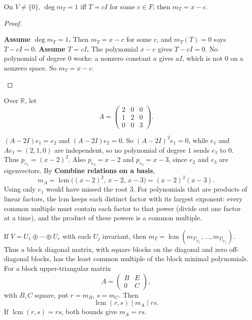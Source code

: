 \begin{proposition*}
On $V\ne\{0\}$, $\deg m_T=1$ iff $T=cI$ for some $c\in F$; then $m_T=x-c$.
\end{proposition*}
\begin{prob}\begin{proof}\begin{steps}
\ii \textbf{Assume $\deg m_T=1$.} Then $m_T=x-c$ for some $c$, and $m_T(T)=0$ says $T-cI=0$.
\ii \textbf{Assume $T=cI$.} The polynomial $x-c$ gives $T-cI=0$. No polynomial of degree $0$ works: a nonzero constant $a$ gives $aI$, which is not $0$ on a nonzero space. So $m_T=x-c$.
\end{steps}\end{proof}\end{prob}
\begin{example*}
Over $\mathbb R$, let
\[ A=\begin{pmatrix}2&0&0\\1&2&0\\0&0&3\end{pmatrix}. \]
\begin{steps}
\ii $(A-2I)e_1=e_2$ and $(A-2I)e_2=0$. So $(A-2I)^2e_1=0$, while $e_1$ and $Ae_1=(2,1,0)$ are independent, so no polynomial of degree $1$ sends $e_1$ to $0$. Thus $p_{e_1}=(x-2)^2$. Also $p_{e_2}=x-2$ and $p_{e_3}=x-3$, since $e_2$ and $e_3$ are eigenvectors.
\ii By \textbf{Combine relations on a basis},
\[ m_A=\operatorname{lcm}\bigl((x-2)^2,\,x-2,\,x-3\bigr)=(x-2)^2(x-3). \]
 Using only $e_1$ would have missed the root $3$. For polynomials that are products of linear factors, the lcm keeps each distinct factor with its largest exponent: every common multiple must contain each factor to that power (divide out one factor at a time), and the product of these powers is a common multiple.
\end{steps}\end{example*}
\begin{proposition*}
If $V=U_1\oplus\cdots\oplus U_r$ with each $U_j$ invariant, then $m_T=\operatorname{lcm}(m_{T|_{U_1}},\ldots,m_{T|_{U_r}})$. Thus a block diagonal matrix, with square blocks on the diagonal and zero off-diagonal blocks, has the least common multiple of the block minimal polynomials.
For a block upper-triangular matrix
\[ A=\begin{pmatrix}B&E\\0&C\end{pmatrix}, \]
with $B,C$ square, put $r=m_B$, $s=m_C$. Then
\[\operatorname{lcm}(r,s)\mid m_A\mid rs.\]
If $\operatorname{lcm}(r,s)=rs$, both bounds give $m_A=rs$.
\end{proposition*}
